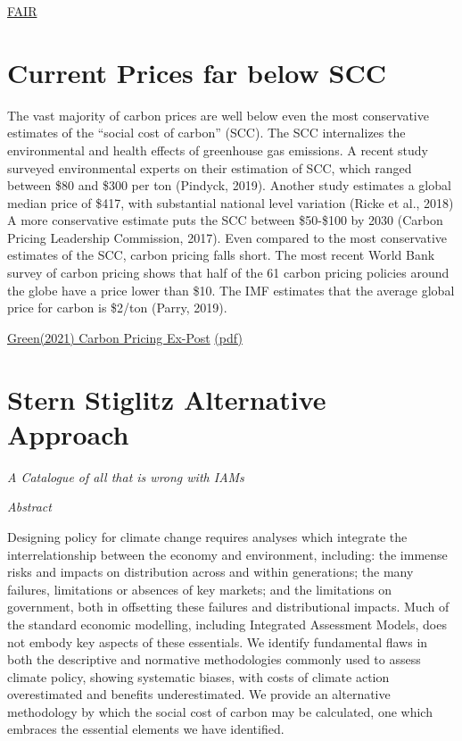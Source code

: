 \documentclass[
]{book}
\begin{document}
\href{https://fair.readthedocs.io/en/latest/}{FAIR}

\hypertarget{current-prices-far-below-scc}{%
\section{Current Prices far below SCC}\label{current-prices-far-below-scc}}

The vast majority of carbon prices are
well below even the most conservative estimates of the ``social cost of carbon'' (SCC).
The SCC internalizes the environmental and health effects of greenhouse gas emissions. A recent study
surveyed environmental experts on their estimation of SCC, which ranged between \$80 and
\$300 per ton (Pindyck, 2019). Another study estimates a global median price of \$417, with
substantial national level variation (Ricke et al., 2018) A more conservative estimate puts the
SCC between \$50-\$100 by 2030 (Carbon Pricing Leadership Commission, 2017).
Even compared to the most conservative estimates of the SCC, carbon pricing falls short. The
most recent World Bank survey of carbon pricing shows that half of the 61 carbon pricing
policies around the globe have a price lower than \$10. The IMF estimates that the average
global price for carbon is \$2/ton (Parry, 2019).

\href{https://iopscience.iop.org/article/10.1088/1748-9326/abdae9/meta}{Green(2021) Carbon Pricing Ex-Post}
\href{pdf/Green_2021_Carbon_Pricing_Ex-Post.pdf}{(pdf)}

\hypertarget{stern-stiglitz-alternative-approach}{%
\section{Stern Stiglitz Alternative Approach}\label{stern-stiglitz-alternative-approach}}

\emph{A Catalogue of all that is wrong with IAMs}

\emph{Abstract}

Designing policy for climate change requires analyses which integrate the interrelationship
between the economy and environment, including: the immense risks and impacts on distribution
across and within generations; the many failures, limitations or absences of key markets; and the
limitations on government, both in offsetting these failures and distributional impacts. Much of
the standard economic modelling, including Integrated Assessment Models, does not embody key
aspects of these essentials. We identify fundamental flaws in both the descriptive and normative
methodologies commonly used to assess climate policy, showing systematic biases, with costs of
climate action overestimated and benefits underestimated. We provide an alternative
methodology by which the social cost of carbon may be calculated, one which embraces the
essential elements we have identified.
\end{document}
